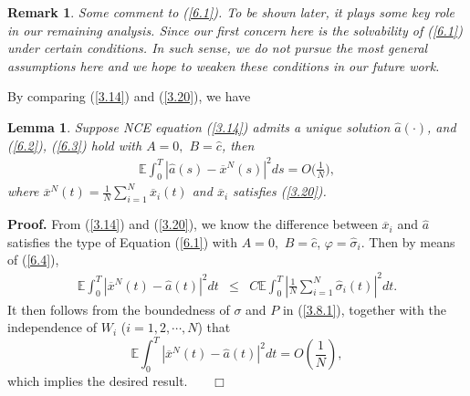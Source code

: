 \documentclass[11pt]{article}
\newenvironment{proof}[1][Proof]{\noindent \textbf{#1.} }{\ \ \  $\Box$}
\newtheorem{lemma}{Lemma}[section]
\newtheorem{remark}{Remark}[section]
\def\dbE{\mathbb{E}}
\begin{document}
\begin{remark}
Some comment to (\ref{6.1}). To be shown later, it plays some key role in our remaining analysis. Since our first
concern here is the solvability of (\ref{6.1}) under
certain conditions. In such sense, we do not pursue the most general assumptions here and we hope to weaken these conditions in our future work.
\end{remark}

By comparing (\ref{3.14}) and (\ref{3.20}), we have

\begin{lemma}\label{lemma-2}
Suppose NCE equation (\ref{3.14}) admits a unique solution
$\widehat{a}(\cdot)$, and (\ref{6.2}), (\ref{6.3}) hold with $A=0,$
$B=\widehat{c}$,
 then
\begin{eqnarray}\label{3.22}
\dbE\int_0^T|\widehat{a}(s)-\overline{x}^{N}(s)|^2ds=O\Big(\frac{1}{N}\Big),
\end{eqnarray}
where
$\overline{x}^{N}(t)=\frac{1}{N}\sum\limits_{i=1}^{N}\overline{x}_{i}(t)$
and $\overline{x}_i$ satisfies (\ref{3.20}).
\end{lemma}
\begin{proof}
From (\ref{3.14}) and (\ref{3.20}), we know the difference between
$\overline{x}_i$ and $\widehat{a}$ satisfies the type of Equation
(\ref{6.1}) with $A=0,$ $B=\widehat{c}$,
$\varphi=\widehat{\sigma}_i$. Then by means of (\ref{6.4}),
%
\begin{eqnarray*}
\dbE\int_0^T|\overline{x}^{N}(t)-\widehat{a}(t)|^{2}dt &\leq &C\dbE\int_0^T\left\vert \frac{1}{N}%
\sum_{i=1}^{N}\widehat{\sigma }_{i}(t)\right\vert ^{2}dt.
\end{eqnarray*}%
%
It then follows from the boundedness of $\sigma$ and $P$ in
(\ref{3.8.1}), together with the independence of $W_i$
($i=1,2,\cdots,N$) that
%
\[
\dbE\int_{0}^{T}|\overline{x}^{N}(t)-\widehat{a}(t)|^{2}dt=O\left(\frac{1}{N}\right),
\]
%
which implies the desired result. \hfill
\end{proof}
\end{document}

